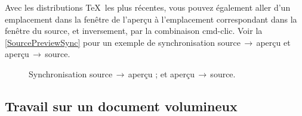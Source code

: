 \documentclass[11pt,french]{article}
\newcommand{\cmd}[1]{\textsf{#1}}
\newcommand{\To}{\,\(\to\)\,}
\begin{document}
Avec les distributions \TeX\ les plus récentes, vous pouvez également aller d'un emplacement dans la fenêtre de l'aperçu à l'emplacement correspondant dans la fenêtre du source, et inversement, par la combinaison \cmd{cmd-clic}. Voir la \vref{SourcePreviewSync} pour un exemple de synchronisation source\To aperçu et aperçu\To source.



\begin{figure}
\centering
{}%
\hfill%
%
\caption[Source/Preview Synch.]{
 Synchronisation source\To aperçu ; et
 aperçu\To source.}
\label{SourcePreviewSync}
\end{figure}

\subsection{Travail sur un document volumineux}
\end{document}
